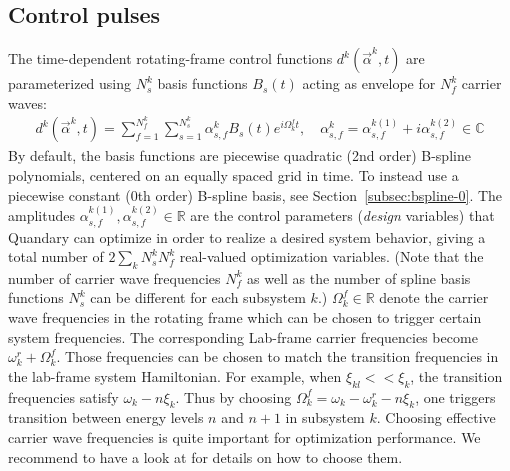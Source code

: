 \documentclass[11pt]{article}
\newcommand{\R}{\mathds{R}}
\newcommand{\C}{\mathds{C}}
\begin{document}
\subsection{Control pulses} \label{subsec:controlpulses}
The time-dependent rotating-frame control functions $d^k(\vec{\alpha}^k,t)$ are parameterized using $N_s^k$ basis functions $B_s(t)$ acting as envelope for $N_f^k$ carrier waves:
\begin{align}\label{eq:spline-ctrl}
  d^k(\vec{\alpha}^k,t) = \sum_{f=1}^{N_f^k} \sum_{s=1}^{N_s^k} \alpha_{s,f}^k B_s(t) e^{i\Omega_k^ft}, \quad \alpha_{s,f}^k = \alpha_{s,f}^{k(1)} + i \alpha_{s,f}^{k(2)} \in \C
\end{align}
By default, the basis functions are piecewise quadratic (2nd order) B-spline polynomials, centered on an equally spaced grid in time. To instead use a piecewise constant (0th order) B-spline basis, see Section~\ref{subsec:bspline-0}.
The amplitudes $\alpha_{s,f}^{k(1)}, \alpha_{s,f}^{k(2)} \in \R$ are the control
parameters (\textit{design} variables) that Quandary can optimize in order to realize a
desired system behavior, giving a total number of $2\sum_k N_s^k N_f^k$ real-valued optimization variables. (Note that the number of carrier wave frequencies $N_f^k$ as well as the number of spline basis functions $N_s^k$ can be different for each subsystem $k$.) $\Omega_k^f \in \R$ denote the carrier wave frequencies in the rotating frame which can be chosen to trigger certain system frequencies. The corresponding Lab-frame carrier frequencies become $\omega_k^r + \Omega_k^f$. Those frequencies can be chosen to match the transition frequencies in the lab-frame system Hamiltonian. For example, when $\xi_{kl} << \xi_k$, the transition frequencies satisfy $\omega_k - n\xi_k$. Thus by choosing $\Omega_k^f = \omega_k-\omega_k^r - n \xi_k$, one triggers transition between energy levels $n$ and $n+1$ in subsystem $k$. Choosing effective carrier wave frequencies is quite important for optimization performance. We recommend to have a look at \cite{petersson2021optimal} for details on how to choose them.
\end{document}
